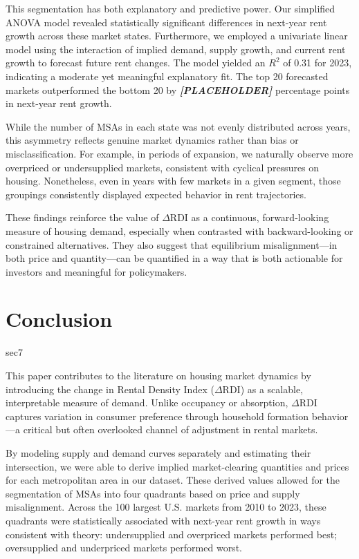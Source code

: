 \documentclass[APA,Times1COL]{WileyNJDv5} %
\begin{document}
This segmentation has both explanatory and predictive power. Our simplified ANOVA model revealed statistically significant differences in next-year rent growth across these market states. Furthermore, we employed a univariate linear model using the interaction of implied demand, supply growth, and current rent growth to forecast future rent changes. The model yielded an \(R^2\) of 0.31 for 2023, indicating a moderate yet meaningful explanatory fit. The top 20 forecasted markets outperformed the bottom 20 by \textbf{\textit{[PLACEHOLDER]}} percentage points in next-year rent growth.

While the number of MSAs in each state was not evenly distributed across years, this asymmetry reflects genuine market dynamics rather than bias or misclassification. For example, in periods of expansion, we naturally observe more overpriced or undersupplied markets, consistent with cyclical pressures on housing. Nonetheless, even in years with few markets in a given segment, those groupings consistently displayed expected behavior in rent trajectories.

These findings reinforce the value of \(\Delta\text{RDI}\) as a continuous, forward-looking measure of housing demand, especially when contrasted with backward-looking or constrained alternatives. They also suggest that equilibrium misalignment---in both price and quantity---can be quantified in a way that is both actionable for investors and meaningful for policymakers.

\section{Conclusion}{sec7}

This paper contributes to the literature on housing market dynamics by introducing the change in Rental Density Index (\(\Delta\text{RDI}\)) as a scalable, interpretable measure of demand. Unlike occupancy or absorption, \(\Delta\text{RDI}\) captures variation in consumer preference through household formation behavior---a critical but often overlooked channel of adjustment in rental markets.

By modeling supply and demand curves separately and estimating their intersection, we were able to derive implied market-clearing quantities and prices for each metropolitan area in our dataset. These derived values allowed for the segmentation of MSAs into four quadrants based on price and supply misalignment. Across the 100 largest U.S. markets from 2010 to 2023, these quadrants were statistically associated with next-year rent growth in ways consistent with theory: undersupplied and overpriced markets performed best; oversupplied and underpriced markets performed worst.
\end{document}
